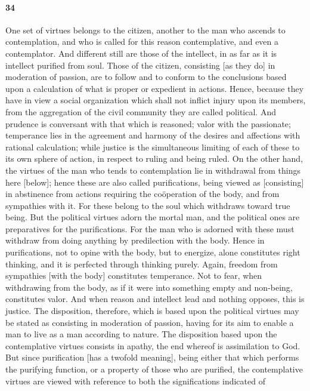 \documentclass[12pt]{article}
\begin{document}
\paragraph{34} One set of virtues belongs to the citizen, another to the man
who ascends to contemplation, and who is called for this reason contemplative,
and even a contemplator. And different still are those of the intellect, in as
far as it is intellect purified from soul. Those of the citizen, consisting [as
they do] in moderation of passion, are to follow and to conform to the
conclusions based upon a calculation of what is proper or expedient in actions.
Hence, because they have in view a social organization which shall not inflict
injury upon its members, from the aggregation of the civil community they are
called political. And prudence is conversant with that which is reasoned; valor
with the passionate; temperance lies in the agreement and harmony of the
desires and affections with rational calculation; while justice is the
simultaneous limiting of each of these to its own sphere of action, in respect
to ruling and being ruled. On the other hand, the virtues of the man who tends
to contemplation lie in withdrawal from things here [below]; hence these are
also called purifications, being viewed as [consisting] in abstinence from
actions requiring the co\"{o}peration of the body, and from sympathies with it.
For these belong to the soul which withdraws toward true being. But the
political virtues adorn the mortal man, and the political ones are preparatives
for the purifications. For the man who is adorned with these must withdraw from
doing anything by predilection with the body. Hence in purifications, not to
opine with the body, but to energize, alone constitutes right thinking, and it
is perfected through thinking purely. Again, freedom from sympathies [with the
body] constitutes temperance. Not to fear, when withdrawing from the body, as
if it were into something empty and non-being, constitutes valor. And when
reason and intellect lead and nothing opposes, this is justice. The
disposition, therefore, which is based upon the political virtues may be stated
as consisting in moderation of passion, having for its aim to enable a man to
live as a man according to nature. The disposition based upon the contemplative
virtues consists in apathy, the end whereof is assimilation to God. But since
purification [has a twofold meaning], being either that which performs the
purifying function, or a property of those who are purified, the contemplative
virtues are viewed with reference to both the significations indicated of
\end{document}
